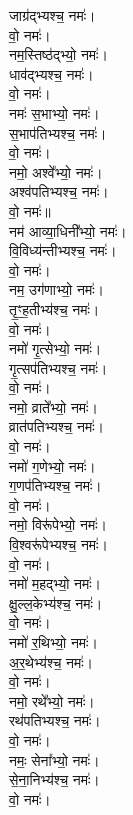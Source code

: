 \begin{multicols}{2}
\begin{flushleft}
जाग्र॑द्भ्यश्च॒  नमः॑।\\
 वो॒ नमः॑।\hfill {}\\
नम॒स्तिष्ठ॑द्भ्यो॒  नमः॑।\\
धाव॑द्भ्यश्च॒  नमः॑।\\
 वो॒ नमः॑।\\
नमः॑ स॒भाभ्यो॒  नमः॑।\\
स॒भाप॑तिभ्यश्च॒ नमः॑।\\
वो॒ नमः॑।\\
नमो॒ अश्वे᳚भ्यो॒  नमः॑।\\
अश्व॑पतिभ्यश्च॒  नमः॑।\\
वो॒ नमः॑॥\\

नम॑ आव्या॒धिनी᳚भ्यो॒  नमः॑।\hfill {}\\
वि॒विध्य॑न्तीभ्यश्च॒  नमः॑।\\
 वो॒ नमः॑।\\
नम॒ उग॑णाभ्यो॒ नमः॑।\\
तृ॒ꣳ॒ह॒तीभ्य॑श्च॒ नमः॑।\\
वो॒ नमः॑।\\
नमो॑ गृ॒त्सेभ्यो॒ नमः॑।\\
गृ॒त्सप॑तिभ्यश्च॒ नमः॑।\\
वो॒ नमः॑।\\
नमो॒ व्राते᳚भ्यो॒ नमः॑।\\
व्रात॑पतिभ्यश्च॒ नमः॑।\hfill {}\\
वो॒ नमः॑।\\
नमो॑ ग॒णेभ्यो॒ नमः॑।\\
ग॒णप॑तिभ्यश्च॒ नमः॑।\\
वो॒ नमः॑।\\
नमो॒ विरू॑पेभ्यो॒ नमः॑।\\
वि॒श्वरू॑पेभ्यश्च॒ नमः॑।\\
वो॒ नमः॑।\\
नमो॑ म॒हद्भ्यो॒ नमः॑।\\
क्षु॒ल्ल॒केभ्य॑श्च॒ नमः॑।\\
वो॒ नमः॑।\hfill {}\\
नमो॑ र॒थिभ्यो॒ नमः॑।\\
अ॒र॒थेभ्य॑श्च॒ नमः॑।\\
वो॒ नमः॑।\\
नमो॒ रथे᳚भ्यो॒ नमः॑।\\
रथ॑पतिभ्यश्च॒ नमः॑।\\
वो॒ नमः॑।\\
नमः॒ सेना᳚भ्यो॒ नमः॑।\\
से॒ना॒निभ्य॑श्च॒ नमः॑।\\
वो॒ नमः॑।\\

\end{flushleft}
\end{multicols}
